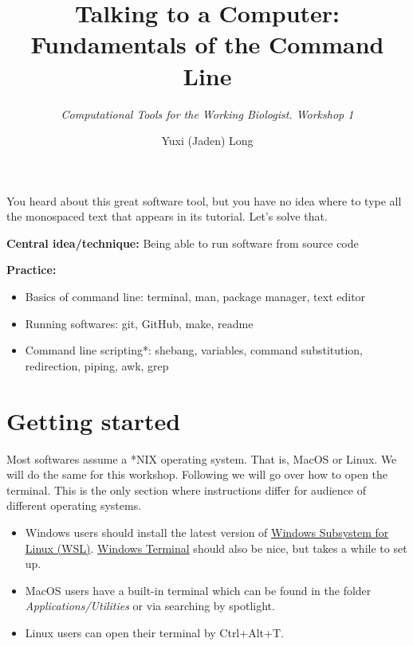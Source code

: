 \documentclass[12pt,letterpaper]{article}
\title{\textbf{Talking to a Computer: Fundamentals of the Command Line}}
\author{\textit{Computational Tools for the Working Biologist. Workshop 1}}
\date{Yuxi (Jaden) Long}
\begin{document}
\maketitle
\thispagestyle{empty}

\vspace{1em}

\noindent
You heard about this great software tool, but you have no idea where to type all the monospaced text that appears in its tutorial. Let's solve that.

\noindent
\textbf{Central idea/technique:} Being able to run software from source code

\textbf{Practice:}

\begin{itemize}
   \item Basics of command line: terminal, man, package manager, text editor
   \item Running softwares: git, GitHub, make, readme
   \item Command line scripting*: shebang, variables, command substitution, redirection, piping, awk, grep
\end{itemize}

\section{Getting started}


Most softwares assume a *NIX operating system. That is, MacOS or Linux. We will do the same for this workshop. Following we will go over how to open the terminal. This is the only section where instructions differ for audience of different operating systems.

\begin{itemize}
   \item Windows users should install the latest version of \href{https://learn.microsoft.com/en-us/windows/wsl/install}{Windows Subsystem for Linux (WSL)}. \href{https://apps.microsoft.com/detail/9N0DX20HK701?hl=en-US&gl=US}{Windows Terminal} should also be nice, but takes a while to set up.
   \item MacOS users have a built-in terminal which can be found in the folder \textit{Applications/Utilities} or via searching by spotlight.
   \item Linux users can open their terminal by Ctrl+Alt+T.
\end{itemize}
\end{document}
